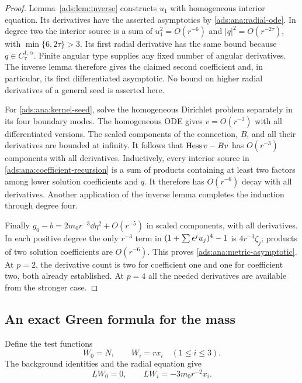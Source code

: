 \begin{proof}
Lemma~\ref{ads:lem:inverse} constructs $u_1$ with homogeneous interior
equation.  Its derivatives have the asserted asymptotics by
\eqref{ads:ana:radial-ode}.  In degree two the interior source is a sum
of $u_1^2=O(r^{-6})$ and $|q|^2=O(r^{-2\tau})$, with
$\min\{6,2\tau\}>3$.  Its first radial derivative has the same
bound because $q\in C^{1,\alpha}_\tau$.  Finite angular type supplies
any fixed number of angular derivatives.  The inverse lemma therefore
gives the claimed second coefficient and, in particular, its first
differentiated asymptotic.  No bound on higher radial derivatives of a
general seed is asserted here.

For \eqref{ads:ana:kernel-seed}, solve the homogeneous Dirichlet problem
separately in its four boundary modes.  The homogeneous ODE gives
$v=O(r^{-3})$ with all differentiated versions.  The scaled components
of the connection, $B$, and all their derivatives are bounded at
infinity.  It follows that $\operatorname{Hess} v-Bv$ has $O(r^{-3})$ components
with all derivatives.  Inductively, every interior source in
\eqref{ads:ana:coefficient-recursion} is a sum of products containing at
least two factors among lower solution coefficients and $q$.
It therefore has $O(r^{-6})$ decay with all derivatives.  Another
application of the inverse lemma completes the induction through
degree four.

Finally $g_0-b=2m_0r^{-3}\dd\eta^2+O(r^{-5})$ in scaled components,
with all derivatives.  In each positive degree the only $r^{-3}$
term in $(1+\sum\epsilon^ju_j)^4-1$ is $4r^{-3}\zeta_j$;
products of two solution coefficients are $O(r^{-6})$.
This proves \eqref{ads:ana:metric-asymptotic}.  At $p=2$, the derivative
count is two for coefficient one and one for coefficient two, both
already established.  At $p=4$ all the needed derivatives are
available from the stronger case.
\end{proof}

\subsection{An exact Green formula for the mass}

Define the test functions
\begin{equation}
 W_0=N,\qquad W_i=rx_i\quad(1\leq i\leq3).
 \label{ads:ana:tests}
\end{equation}
The background identities and the radial equation give
\begin{equation}
 LW_0=0,\qquad LW_i=-3m_0r^{-2}x_i.
 \label{ads:ana:tests-equations}
\end{equation}

